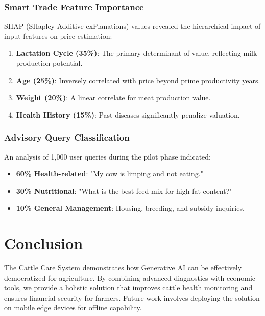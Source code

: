 \documentclass[conference]{IEEEtran}
\begin{document}
\subsubsection{Smart Trade Feature Importance}
SHAP (SHapley Additive exPlanations) values revealed the hierarchical impact of input features on price estimation:
\begin{enumerate}
    \item \textbf{Lactation Cycle (35\%)}: The primary determinant of value, reflecting milk production potential.
    \item \textbf{Age (25\%)}: Inversely correlated with price beyond prime productivity years.
    \item \textbf{Weight (20\%)}: A linear correlate for meat production value.
    \item \textbf{Health History (15\%)}: Past diseases significantly penalize valuation.
\end{enumerate}

\subsubsection{Advisory Query Classification}
An analysis of 1,000 user queries during the pilot phase indicated:
\begin{itemize}
    \item \textbf{60\% Health-related}: "My cow is limping and not eating."
    \item \textbf{30\% Nutritional}: "What is the best feed mix for high fat content?"
    \item \textbf{10\% General Management}: Housing, breeding, and subsidy inquiries.
\end{itemize}

\section{Conclusion}
The Cattle Care System demonstrates how Generative AI can be effectively democratized for agriculture. By combining advanced diagnostics with economic tools, we provide a holistic solution that improves cattle health monitoring and ensures financial security for farmers. Future work involves deploying the solution on mobile edge devices for offline capability.

\end{document}
